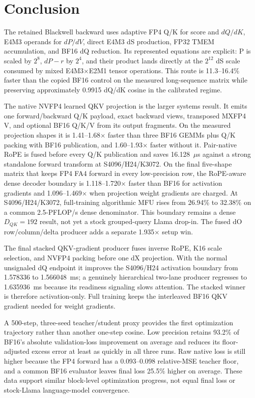 \section{Conclusion}

The retained Blackwell backward uses adaptive FP4 Q/K for score and
$dQ/dK$, E4M3 operands for $dP/dV$, direct E4M3 dS production, FP32 TMEM
accumulation, and BF16 dQ reduction.  Its represented equations are explicit:
P is scaled by $2^8$, $dP-r$ by $2^4$, and their product lands directly at
the $2^{12}$ dS scale consumed by mixed E4M3$\times$E2M1 tensor operations.
This route is 11.3--16.4\% faster than the copied BF16 control on the measured
long-sequence matrix while preserving approximately 0.9915 dQ/dK cosine in
the calibrated regime.

The native NVFP4 learned QKV projection is the larger systems result.  It
emits one forward/backward Q/K payload, exact backward views, transposed
MXFP4 V, and optional BF16 Q/K/V from its output fragments.  On the measured
projection shapes it is 1.41--1.68$\times$ faster than three BF16 GEMMs plus
Q/K packing with BF16 publication, and 1.60--1.93$\times$ faster without it.
Pair-native RoPE is fused before every Q/K publication and saves
16.128~$\mu$s against a strong standalone forward transform at
S4096/H24/K3072.  On the final five-shape matrix that keeps FP4 FA4 forward in
every low-precision row, the RoPE-aware dense decoder boundary is
1.118--1.720$\times$ faster than BF16 for activation gradients and
1.096--1.469$\times$ when projection weight gradients are charged.  At
S4096/H24/K3072, full-training algorithmic MFU rises from 26.94\% to 32.38\%
on a common 2.5-PFLOP/s dense denominator.  This boundary remains a dense
$D_{QK}=192$ result, not yet a stock grouped-query Llama drop-in.  The fused
dO row/column/delta producer adds a separate 1.935$\times$ setup win.

The final stacked QKV-gradient producer fuses inverse RoPE, K16 scale
selection, and NVFP4 packing before one dX projection.  With the normal
unsignaled dQ endpoint it improves the S4096/H24 activation boundary from
1.578336 to 1.566048~ms; a genuinely hierarchical two-lane producer regresses
to 1.635936~ms because its readiness signaling slows attention.  The stacked
winner is therefore activation-only.  Full training keeps the interleaved
BF16 QKV gradient needed for weight gradients.

A 500-step, three-seed teacher/student proxy provides the first optimization
trajectory rather than another one-step cosine.  Low precision retains 93.2\%
of BF16's absolute validation-loss improvement on average and reduces its
floor-adjusted excess error at least as quickly in all three runs.  Raw native
loss is still higher because the FP4 forward has a 0.093--0.098 relative-MSE
teacher floor, and a common BF16 evaluator leaves final loss 25.5\% higher on
average.  These data support similar block-level optimization progress, not
equal final loss or stock-Llama language-model convergence.

